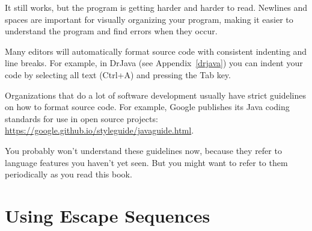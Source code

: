 It still works, but the program is getting harder and harder to read.
Newlines and spaces are important for visually organizing your program, making it easier to understand the program and find errors when they occur.

Many editors will automatically format source code with consistent indenting and line breaks.
For example, in DrJava (see Appendix~\ref{drjava}) you can indent your code by selecting all text ({\sf Ctrl+A}) and pressing the {\sf Tab} key.


\label{computer-programming_style-guidelines}

%



Organizations that do a lot of software development usually have strict guidelines on how to format source code.
For example, Google publishes its Java coding standards for use in open source projects: \url{https://google.github.io/styleguide/javaguide.html}.

You probably won't understand these guidelines now, because they refer to language features you haven't yet seen.
But you might want to refer to them periodically as you read this book.



\section{Using Escape Sequences}
\label{computer-programming_using-escape-sequences}

